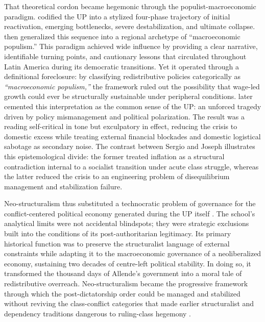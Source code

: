 That theoretical cordon became hegemonic through the populist-macroeconomic paradigm. 
\citet{LarrainMeller1991} codified the UP into a stylized four-phase trajectory of initial reactivation, 
emerging bottlenecks, severe destabilization, and ultimate collapse. \citet{DornbuschEdwards1991} then 
generalized this sequence into a regional archetype of ``macroeconomic populism.'' This paradigm achieved 
wide influence by providing a clear narrative, identifiable turning points, and cautionary lessons that 
circulated throughout Latin America during its democratic transitions. Yet it operated through a 
definitional foreclosure: by classifying redistributive policies categorically as \textit{``macroeconomic 
populism,''} the framework ruled out the possibility that wage-led growth could ever be structurally 
sustainable under peripheral conditions. \citet{Meller2000} later cemented this interpretation as 
the common sense of the UP: an unforced tragedy driven by policy mismanagement and political polarization. 
The result was a reading self-critical in tone but exculpatory in effect, reducing the crisis to domestic 
excess while treating external financial blockades and domestic logistical sabotage as secondary noise. 
The contrast between Sergio \citet{RamosSergio1979} and Joseph \citet{RamosJoseph1980} illustrates this epistemological 
divide: the former treated inflation as a structural contradiction internal to a socialist transition 
under acute class struggle, whereas the latter reduced the crisis to an engineering problem of disequilibrium 
management and stabilization failure.

Neo-structuralism thus substituted a technocratic problem of governance for the 
conflict-centered political economy generated during the UP itself \citep{LarrainMeller1991,DornbuschEdwards1991,Meller2000}. 
The school's analytical limits were not accidental blindspots; they were strategic exclusions built 
into the conditions of its post-authoritarian legitimacy. Its primary historical function was to 
preserve the structuralist language of external constraints while adapting it to the macroeconomic 
governance of a neoliberalized economy, sustaining two decades of centre-left political stability. In 
doing so, it transformed the thousand days of Allende's government into a moral tale of redistributive 
overreach. Neo-structuralism became the progressive framework through which the post-dictatorship order  could be managed and stabilized without reviving the class-conflict categories that made earlier structuralist and dependency traditions dangerous to ruling-class hegemony \citep{Leiva2008}.

